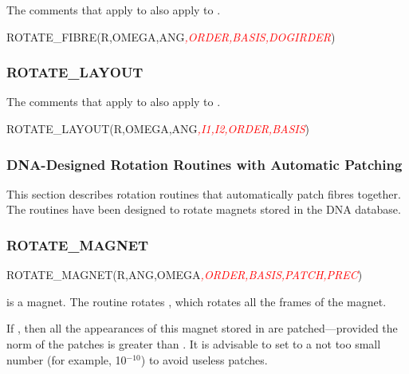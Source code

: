 %
The comments that apply to  also apply to
.

\begin{ptccode}
ROTATE_FIBRE(R,OMEGA,ANG\textit{\textcolor{red}{,ORDER,BASIS,DOGIRDER}})
\end{ptccode}


\subsubsection*{ROTATE_LAYOUT}

%
The comments that apply to  also apply to
.

\begin{ptccode}
ROTATE_LAYOUT(R,OMEGA,ANG\textit{\textcolor{red}{,I1,I2,ORDER,BASIS}})
\end{ptccode}


\subsubsection{DNA-Designed Rotation Routines with Automatic Patching}

%
This section describes rotation routines that automatically patch fibres together.
The routines have been designed to rotate magnets stored in the DNA database.


\subsubsection*{ROTATE_MAGNET}

%
\begin{ptccode}
ROTATE_MAGNET(R,ANG,OMEGA\textit{\textcolor{red}{,ORDER,BASIS,PATCH,PREC}})
\end{ptccode}

 is a magnet. The routine rotates , which rotates
all the frames of the magnet.

If , then all the appearances of this magnet stored in
 are patched---provided the norm of the patches is greater than
. It is advisable to set  to a not too small number
(for example, 10$^{-10}$) to avoid useless patches.

